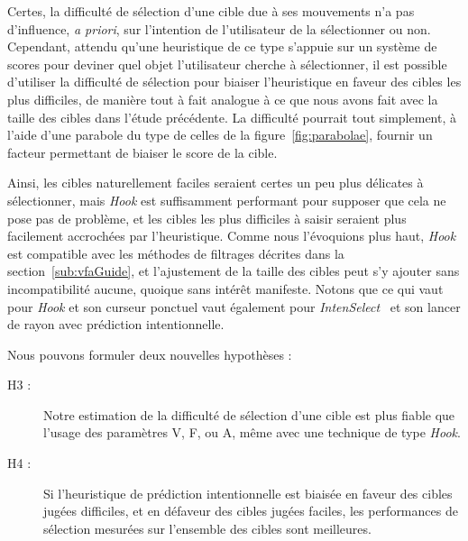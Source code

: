 	Certes, la difficulté de sélection d'une cible due à ses mouvements n'a pas d'influence, \emph{a priori}, sur l'intention de l'utilisateur de la sélectionner ou non. Cependant, attendu qu'une heuristique de ce type s'appuie sur un système de scores pour deviner quel objet l'utilisateur cherche à sélectionner, il est possible d'utiliser la difficulté de sélection pour biaiser l'heuristique en faveur des cibles les plus difficiles, de manière tout à fait analogue à ce que nous avons fait avec la taille des cibles dans l'étude précédente. La difficulté pourrait tout simplement, à l'aide d'une parabole du type de celles de la figure~\ref{fig:parabolae}, fournir un facteur permettant de biaiser le score de la cible.
	
	Ainsi, les cibles naturellement faciles seraient certes un peu plus délicates à sélectionner, mais \emph{Hook} est suffisamment performant pour supposer que cela ne pose pas de problème, et les cibles les plus difficiles à saisir seraient plus facilement \og accrochées \fg{} par l'heuristique. Comme nous l'évoquions plus haut, \emph{Hook} est compatible avec les méthodes de filtrages décrites dans la section~\ref{sub:vfaGuide}, et l'ajustement de la taille des cibles peut s'y ajouter sans incompatibilité aucune, quoique sans intérêt manifeste. Notons que ce qui vaut pour \emph{Hook} et son curseur ponctuel vaut également pour \emph{IntenSelect}~\cite{de2005intenselect} et son lancer de rayon avec prédiction intentionnelle.
	
	Nous pouvons formuler deux nouvelles hypothèses :
	
	\begin{description}
		\item[H3 :] Notre estimation de la difficulté de sélection d'une cible est plus fiable que l'usage des paramètres V, F, ou A, même avec une technique de type \emph{Hook}.
		\item[H4 :] Si l'heuristique de prédiction intentionnelle est biaisée en faveur des cibles jugées difficiles, et en défaveur des cibles jugées faciles, les performances de sélection mesurées sur l'ensemble des cibles sont meilleures.
	\end{description}

	
